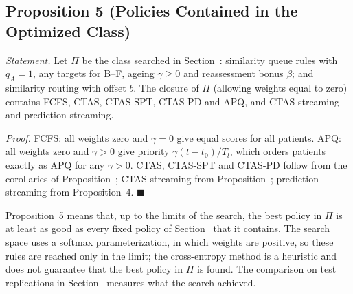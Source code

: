 \subsection{Proposition 5 (Policies Contained in the Optimized Class)}

\emph{Statement.} Let $\Pi$ be the class searched in Section~: similarity queue rules with $q_A=1$, any targets for B--F, ageing $\gamma\ge0$ and reassessment bonus $\beta$; and similarity routing with offset $b$. The closure of $\Pi$ (allowing weights equal to zero) contains FCFS, CTAS, CTAS-SPT, CTAS-PD and APQ, and CTAS streaming and prediction streaming.

\emph{Proof.} FCFS: all weights zero and $\gamma=0$ give equal scores for all patients. APQ: all weights zero and $\gamma>0$ give priority $\gamma(t-t_0)/T_l$, which orders patients exactly as APQ for any $\gamma>0$. CTAS, CTAS-SPT and CTAS-PD follow from the corollaries of Proposition~; CTAS streaming from Proposition~; prediction streaming from Proposition~4. \hfill$\blacksquare$

Proposition~5 means that, up to the limits of the search, the best policy in $\Pi$ is at least as good as every fixed policy of Section~ that it contains. The search space uses a softmax parameterization, in which weights are positive, so these rules are reached only in the limit; the cross-entropy method is a heuristic and does not guarantee that the best policy in $\Pi$ is found. The comparison on test replications in Section~ measures what the search achieved.
